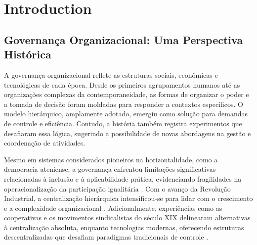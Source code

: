 
%

%

\chapter{Introduction}
\label{cha:Introduction}


\section{Governança Organizacional: Uma Perspectiva Histórica}
\label{sec:contexto_historico}

A governança organizacional reflete as estruturas sociais, econômicas e
tecnológicas de cada época. Desde os primeiros agrupamentos humanos até as
organizações complexas da contemporaneidade, as formas de organizar o poder
e a tomada de decisão foram moldadas para responder a contextos
específicos. O modelo hierárquico, amplamente adotado, emergiu como solução
para demandas de controle e eficiência. Contudo, a história também registra
experimentos que desafiaram essa lógica, sugerindo a possibilidade de novas
abordagens na gestão e coordenação de atividades.

Mesmo em sistemas considerados pioneiros na horizontalidade, como a
democracia ateniense, a governança enfrentou limitações significativas
relacionadas à inclusão e à aplicabilidade prática, evidenciando
fragilidades na operacionalização da participação igualitária
\cite{AthenianDemocracyABrief}. Com o avanço da Revolução Industrial, a
centralização hierárquica intensificou-se para lidar com o crescimento e a
complexidade organizacional \cite{WorkerCooperativesandRevolution}.
Adicionalmente, experiências como as cooperativas e os movimentos
sindicalistas do século XIX delinearam alternativas à centralização absoluta,
enquanto tecnologias modernas, oferecendo estruturas descentralizadas que desafiam paradigmas
tradicionais de controle \cite{WorkerCooperativesinAmerica, EverydayRevolutions}.

